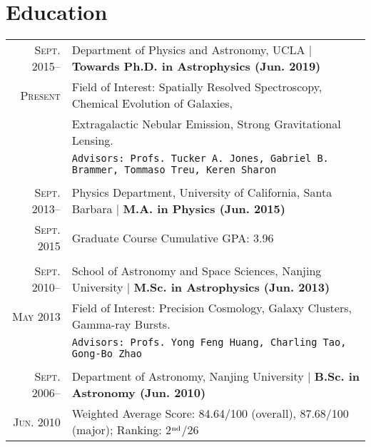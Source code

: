 \documentclass[letterpaper,10pt]{article}
\newcommand{\narrow}{-1.8ex}
\begin{document}
\section{Education}
\begin{tabular}{r|p{6.5in}}
  \textsc{Sept. 2015}--     & Department of Physics and Astronomy, UCLA    |   \textbf{Towards Ph.D. in Astrophysics (Jun. 2019)}   \\
  \textsc{Present}          & Field of Interest: Spatially Resolved Spectroscopy, Chemical Evolution of Galaxies, \\
                            & \hspace*{7.3em} Extragalactic Nebular Emission, Strong Gravitational Lensing. \\
                            & \texttt{Advisors: Profs. Tucker A. Jones, Gabriel B. Brammer, Tommaso Treu, Keren Sharon}     \\
  \multicolumn{2}{c}{} \\[\narrow]
  \textsc{Sept. 2013}--     & Physics Department, University of California, Santa Barbara    |   \textbf{M.A. in Physics (Jun. 2015)}   \\
  \textsc{Sept. 2015}       & Graduate Course Cumulative GPA: 3.96     \\
  \multicolumn{2}{c}{} \\[\narrow]
  \textsc{Sept. 2010}--     & School of Astronomy and Space Sciences, Nanjing University  |  \textbf{M.Sc. in Astrophysics (Jun. 2013)}   \\
  \textsc{May 2013}         & Field of Interest: Precision Cosmology, Galaxy Clusters, Gamma-ray Bursts. \\
                            & \texttt{Advisors: Profs. Yong Feng Huang, Charling Tao, Gong-Bo Zhao}   \\
  \multicolumn{2}{c}{} \\[\narrow]
  \textsc{Sept. 2006}--     &   Department of Astronomy, Nanjing University  |  \textbf{B.Sc. in Astronomy (Jun. 2010)}    \\
  \textsc{Jun. 2010}        &   Weighted Average Score: 84.64/100 (overall), 87.68/100 (major); Ranking: 2$^{\rm nd}$/26  \\
\end{tabular}
\end{document}
